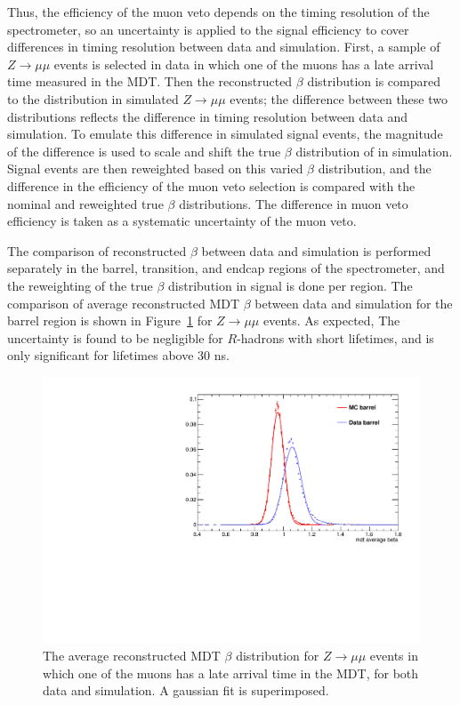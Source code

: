 Thus, the efficiency of the muon veto depends on the timing resolution of the spectrometer, so an uncertainty is applied to the signal efficiency to cover differences in timing resolution between data and simulation. 
First, a sample of $Z\rightarrow\mu\mu$ events is selected in data in which one of the muons has a late arrival time measured in the \ac{MDT}. 
Then the reconstructed $\beta$ distribution is compared to the distribution in simulated $Z\rightarrow\mu\mu$ events; the difference between these two distributions reflects the difference in timing resolution between data and simulation.
To emulate this difference in simulated signal events, the magnitude of the difference is used to scale and shift the true $\beta$ distribution of \rhadrons in simulation. 
Signal events are then reweighted based on this varied $\beta$ distribution, and the difference in the efficiency of the muon veto selection is compared with the nominal and reweighted true $\beta$ distributions. 
The difference in muon veto efficiency is taken as a systematic uncertainty of the muon veto. 
 
The comparison of reconstructed $\beta$ between data and simulation is performed separately in the barrel, transition, and endcap regions of the spectrometer, and the reweighting of the true $\beta$ distribution in signal is done per region. 
The comparison of average reconstructed \ac{MDT} $\beta$ between data and simulation for the barrel region is shown in Figure~\ref{fig:mdt_beta} for $Z\rightarrow\mu\mu$ events.
As expected, The uncertainty is found to be negligible for $R$-hadrons with short lifetimes, and is only significant for lifetimes above 30 ns.

\begin{figure}[hbtp]
\centering
\includegraphics[width=\fullfig]{figures/beta_muonveto.pdf}
\caption{The average reconstructed MDT $\beta$ distribution for $Z\rightarrow\mu\mu$ events in which one of the muons has a late arrival time in the \acs*{MDT}, for both data and simulation. A gaussian fit is superimposed.}
\label{fig:mdt_beta}
\end{figure}

